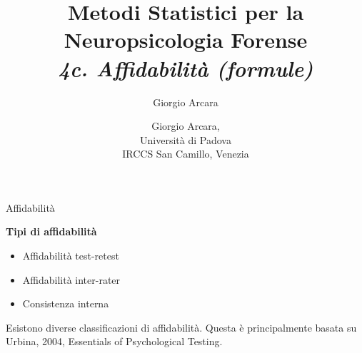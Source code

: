 \documentclass[
  ignorenonframetext,
]{beamer}
\author{Giorgio Arcara}
\date{}
\providecommand{\tightlist}{%
  \setlength{\itemsep}{0pt}\setlength{\parskip}{0pt}}
\begin{document}
\begin{frame}
\title{Metodi Statistici per la Neuropsicologia Forense\\ \vspace{1em} \emph{4c. Affidabilità (formule)}}
\author{Giorgio Arcara,\\ Università di Padova \\ IRCCS San Camillo, Venezia}

\maketitle
\end{frame}

\begin{frame}{Affidabilità}
\label{affidabilituxe0}
\begin{center}
  \textbf{Tipi di affidabilità}
\end{center}
\vspace{2em}

\begin{itemize}
\tightlist
\item
  Affidabilità test-retest
\item
  Affidabilità inter-rater
\item
  Consistenza interna
\end{itemize}

\vspace{2em}

Esistono diverse classificazioni di affidabilità. Questa è
principalmente basata su Urbina, 2004, Essentials of Psychological
Testing.
\end{frame}
\end{document}
